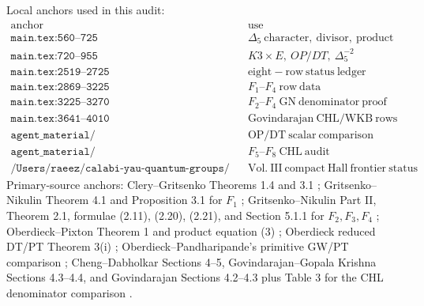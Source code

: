 \begin{remark}
Local anchors used in this audit:
\[
\begin{array}{c|c}
\mathrm{anchor}&\mathrm{use}\\ \hline
\texttt{main.tex:560--725}&\Delta_5\ \mathrm{character,\ divisor,\ product}\\
\texttt{main.tex:720--955}&K3\times E,\ OP/DT,\ \Delta_5^{-2}\\
\texttt{main.tex:2519--2725}&\mathrm{eight-row\ status\ ledger}\\
\texttt{main.tex:2869--3225}&F_1\mbox{--}F_4\ \mathrm{row\ data}\\
\texttt{main.tex:3225--3270}&F_2\mbox{--}F_4\ \mathrm{GN\ denominator\ proof}\\
\texttt{main.tex:3641--4010}&\mathrm{Govindarajan\ CHL/WKB\ rows}\\
\texttt{agent\_material/10\_reduced\_dt\_pt\_op\_comparison\_theorem.tex}
&\mathrm{OP/DT\ scalar\ comparison}\\
\texttt{agent\_material/11\_chl\_boundary\_primary\_source\_audit.tex}
&F_5\mbox{--}F_8\ \mathrm{CHL\ audit}\\
\texttt{/Users/raeez/calabi-yau-quantum-groups/README.md:60--75}
&\mathrm{Vol.\ III\ compact\ Hall\ frontier\ status}
\end{array}
\]
Primary-source anchors:
Clery--Gritsenko Theorems 1.4 and 3.1 \cite{GC};
Gritsenko--Nikulin Theorem 4.1 and Proposition 3.1 for \(F_1\)
\cite{GN}; Gritsenko--Nikulin Part II, Theorem 2.1, formulae
(2.11), (2.20), (2.21), and Section 5.1.1 for \(F_2,F_3,F_4\)
\cite{GNII}; Oberdieck--Pixton Theorem 1 and product equation (3)
\cite{OB}; Oberdieck reduced DT/PT Theorem 3(i)
\cite{OberdieckReducedPT}; Oberdieck--Pandharipande's primitive
GW/PT comparison \cite{OPand}; Cheng--Dabholkar Sections 4--5,
Govindarajan--Gopala Krishna Sections 4.3--4.4, and Govindarajan
Sections 4.2--4.3 plus Table 3 for the CHL denominator comparison
\cite{CD09BKM,GK09CHL,Gov11BKM}.
\end{remark}


